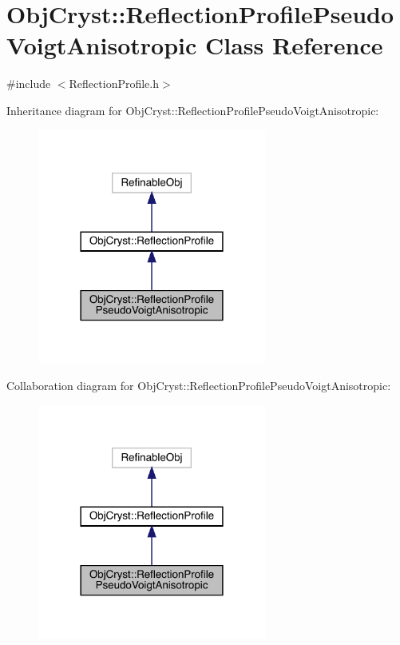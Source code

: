 \hypertarget{class_obj_cryst_1_1_reflection_profile_pseudo_voigt_anisotropic}{}\section{Obj\+Cryst\+::Reflection\+Profile\+Pseudo\+Voigt\+Anisotropic Class Reference}
\label{class_obj_cryst_1_1_reflection_profile_pseudo_voigt_anisotropic}


{\ttfamily \#include $<$Reflection\+Profile.\+h$>$}



Inheritance diagram for Obj\+Cryst\+::Reflection\+Profile\+Pseudo\+Voigt\+Anisotropic\+:
\nopagebreak
\begin{figure}[H]
\begin{center}
\leavevmode
\includegraphics[width=213pt]{class_obj_cryst_1_1_reflection_profile_pseudo_voigt_anisotropic__inherit__graph}
\end{center}
\end{figure}


Collaboration diagram for Obj\+Cryst\+::Reflection\+Profile\+Pseudo\+Voigt\+Anisotropic\+:
\nopagebreak
\begin{figure}[H]
\begin{center}
\leavevmode
\includegraphics[width=213pt]{class_obj_cryst_1_1_reflection_profile_pseudo_voigt_anisotropic__coll__graph}
\end{center}
\end{figure}
